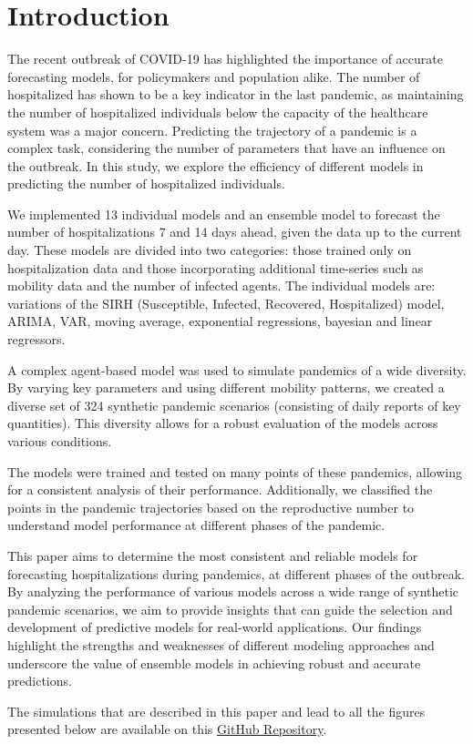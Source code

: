 \section{Introduction}

The recent outbreak of COVID-19 has highlighted the importance of accurate forecasting models, for policymakers and population alike. 
The number of hospitalized has shown to be a key indicator in the last pandemic, as maintaining the number of hospitalized individuals below the capacity of the healthcare system was a major concern.
Predicting the trajectory of a pandemic is a complex task, considering the number of parameters that have an influence on the outbreak. 
In this study, we explore the efficiency of different models in predicting the number of hospitalized individuals. 

We implemented 13 individual models and an ensemble model to forecast the number of hospitalizations 7 and 14 days ahead, given the data up to the current day.
These models are divided into two categories: those trained only on hospitalization data and those incorporating additional time-series such as mobility data and the number of infected agents. 
The individual models are: variations of the SIRH (Susceptible, Infected, Recovered, Hospitalized) model, ARIMA, VAR, moving average, exponential regressions, bayesian and linear regressors.

A complex agent-based model was used to simulate pandemics of a wide diversity. 
By varying key parameters and using different mobility patterns, we created a diverse set of 324 synthetic pandemic scenarios (consisting of daily reports of key quantities). 
This diversity allows for a robust evaluation of the models across various conditions.

The models were trained and tested on many points of these pandemics, allowing for a consistent analysis of their performance. 
Additionally, we classified the points in the pandemic trajectories based on the reproductive number to understand model performance at different phases of the pandemic.

This paper aims to determine the most consistent and reliable models for forecasting hospitalizations during pandemics, at different phases of the outbreak. 
By analyzing the performance of various models across a wide range of synthetic pandemic scenarios, we aim to provide insights that can guide the selection and development of predictive models for real-world applications. 
Our findings highlight the strengths and weaknesses of different modeling approaches and underscore the value of ensemble models in achieving robust and accurate predictions.

The simulations that are described in this paper and lead to all the figures presented below are available on this  \href{https://github.com/gregoirebechade/covid_internship}{GitHub Repository}\label{github-link}.

